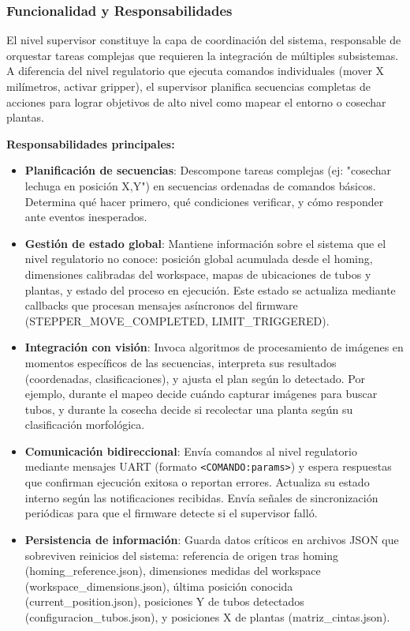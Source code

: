 \subsubsection{Funcionalidad y Responsabilidades}

El nivel supervisor constituye la capa de coordinación del sistema, responsable de orquestar tareas complejas que requieren la integración de múltiples subsistemas. A diferencia del nivel regulatorio que ejecuta comandos individuales (mover X milímetros, activar gripper), el supervisor planifica secuencias completas de acciones para lograr objetivos de alto nivel como mapear el entorno o cosechar plantas.

\textbf{Responsabilidades principales:}

\begin{itemize}
    \item \textbf{Planificación de secuencias}: Descompone tareas complejas (ej: "cosechar lechuga en posición X,Y") en secuencias ordenadas de comandos básicos. Determina qué hacer primero, qué condiciones verificar, y cómo responder ante eventos inesperados.

    \item \textbf{Gestión de estado global}: Mantiene información sobre el sistema que el nivel regulatorio no conoce: posición global acumulada desde el homing, dimensiones calibradas del workspace, mapas de ubicaciones de tubos y plantas, y estado del proceso en ejecución. Este estado se actualiza mediante callbacks que procesan mensajes asíncronos del firmware (STEPPER\_MOVE\_COMPLETED, LIMIT\_TRIGGERED).

    \item \textbf{Integración con visión}: Invoca algoritmos de procesamiento de imágenes en momentos específicos de las secuencias, interpreta sus resultados (coordenadas, clasificaciones), y ajusta el plan según lo detectado. Por ejemplo, durante el mapeo decide cuándo capturar imágenes para buscar tubos, y durante la cosecha decide si recolectar una planta según su clasificación morfológica.

    \item \textbf{Comunicación bidireccional}: Envía comandos al nivel regulatorio mediante mensajes UART (formato \texttt{<COMANDO:params>}) y espera respuestas que confirman ejecución exitosa o reportan errores. Actualiza su estado interno según las notificaciones recibidas. Envía señales de sincronización periódicas para que el firmware detecte si el supervisor falló.

    \item \textbf{Persistencia de información}: Guarda datos críticos en archivos JSON que sobreviven reinicios del sistema: referencia de origen tras homing (homing\_reference.json), dimensiones medidas del workspace (workspace\_dimensions.json), última posición conocida (current\_position.json), posiciones Y de tubos detectados (configuracion\_tubos.json), y posiciones X de plantas (matriz\_cintas.json).
\end{itemize}

